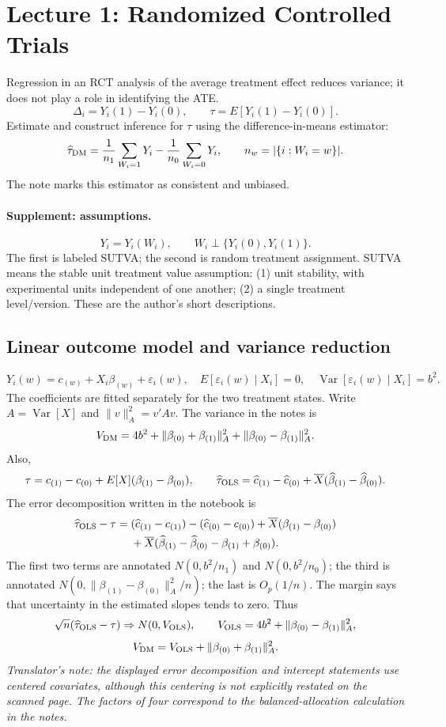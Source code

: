 \section{Lecture 1: Randomized Controlled Trials}
Regression in an RCT analysis of the average treatment effect reduces variance; it does not play a role in identifying the ATE.
\[
\Delta_i=Y_i(1)-Y_i(0),\qquad \tau=E[Y_i(1)-Y_i(0)].
\]
Estimate and construct inference for $\tau$ using the difference-in-means estimator:
\[
\widehat\tau_{\rm DM}=\frac1{n_1}\sum_{W_i=1}Y_i-\frac1{n_0}\sum_{W_i=0}Y_i,
\qquad n_w=|\{i:W_i=w\}|.
\]
The note marks this estimator as consistent and unbiased.
\paragraph{Supplement: assumptions.}
\[
Y_i=Y_i(W_i),\qquad W_i\perp\{Y_i(0),Y_i(1)\}.
\]
The first is labeled SUTVA; the second is random treatment assignment. SUTVA means the stable unit treatment value assumption: (1) unit stability, with experimental units independent of one another; (2) a single treatment level/version. These are the author's short descriptions.
\subsection{Linear outcome model and variance reduction}
\[
Y_i(w)=c_{(w)}+X_i\beta_{(w)}+\varepsilon_i(w),\quad
E[\varepsilon_i(w)\mid X_i]=0,\quad
\operatorname{Var}[\varepsilon_i(w)\mid X_i]=b^2.
\]
The coefficients are fitted separately for the two treatment states. Write $A=\operatorname{Var}[X]$ and $\|v\|_A^2=v'Av$. The variance in the notes is
\[
V_{\rm DM}=4b^2+\|\beta_{(0)}+\beta_{(1)}\|_A^2
 +\|\beta_{(0)}-\beta_{(1)}\|_A^2.
\]
Also,
\[
\tau=c_{(1)}-c_{(0)}+E[X](\beta_{(1)}-\beta_{(0)}),\qquad
\widehat\tau_{\rm OLS}=\widehat c_{(1)}-\widehat c_{(0)}
 +\overline X(\widehat\beta_{(1)}-\widehat\beta_{(0)}).
\]
The error decomposition written in the notebook is
\begin{align*}
\widehat\tau_{\rm OLS}-\tau={}&(\widehat c_{(1)}-c_{(1)})-(\widehat c_{(0)}-c_{(0)})
 +\overline X(\beta_{(1)}-\beta_{(0)})\\
&+\overline X(\widehat\beta_{(1)}-\widehat\beta_{(0)}-\beta_{(1)}+\beta_{(0)}).
\end{align*}
The first two terms are annotated $N(0,b^2/n_1)$ and $N(0,b^2/n_0)$; the third is annotated $N(0,\|\beta_{(1)}-\beta_{(0)}\|_A^2/n)$; the last is $O_p(1/n)$. The margin says that uncertainty in the estimated slopes tends to zero. Thus
\[
\sqrt n(\widehat\tau_{\rm OLS}-\tau)\Rightarrow N(0,V_{\rm OLS}),\qquad
V_{\rm OLS}=4b^2+\|\beta_{(0)}-\beta_{(1)}\|_A^2,
\]
\[
V_{\rm DM}=V_{\rm OLS}+\|\beta_{(0)}+\beta_{(1)}\|_A^2.
\]
\textit{Translator's note: the displayed error decomposition and intercept statements use centered covariates, although this centering is not explicitly restated on the scanned page. The factors of four correspond to the balanced-allocation calculation in the notes.}
